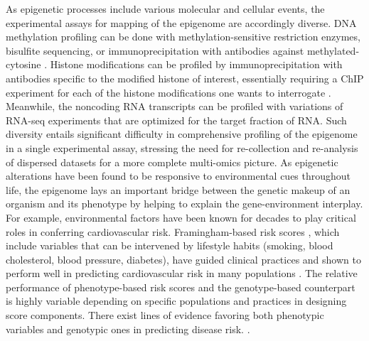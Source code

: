 \documentclass[letter]{bioinfo}
\begin{document}
	As epigenetic processes include various molecular and cellular events, the experimental assays for mapping of the epigenome are accordingly diverse. DNA methylation profiling can be done with methylation-sensitive restriction enzymes, bisulfite sequencing, or immunoprecipitation with antibodies against methylated-cytosine \citep{Bibikova:2010:Genomewide}. Histone modifications can be profiled by immunoprecipitation with antibodies specific to the modified histone of interest, essentially requiring a ChIP experiment for each of the histone modifications one wants to interrogate \citep{Kimura:2013:Histone}. Meanwhile, the noncoding RNA transcripts can be profiled with variations of RNA-seq experiments that are optimized for the target fraction of RNA. Such diversity entails significant difficulty in comprehensive profiling of the epigenome in a single experimental assay, stressing the need for re-collection and re-analysis of dispersed datasets for a more complete multi-omics picture. As epigenetic alterations have been found to be responsive to environmental cues throughout life, the epigenome lays an important bridge between the genetic makeup of an organism and its phenotype by helping to explain the gene-environment interplay.
	For example, environmental factors have been known for decades to play critical roles in conferring cardiovascular risk. Framingham-based risk scores \citep{Sheridan:2003:Framinghambased}, which include variables that can be intervened by lifestyle habits (smoking, blood cholesterol, blood pressure, diabetes), have guided clinical practices \citep{British:1998:Joint} and shown to perform well in predicting cardiovascular risk in many populations \citep{Knuiman:1997:Prediction,Eichler:2007:Prediction}. The relative performance of phenotype-based risk scores and the genotype-based counterpart is highly variable depending on specific populations and practices in designing score components. There exist lines of evidence favoring both phenotypic variables \citep{Talmud:2010:Utility} and genotypic ones in predicting disease risk.
	\citep{DAgostino:2001:Validation,Empana:2003:Are,Eichler:2007:Prediction,Zomer:2014:Cardiovascular}.
\end{document}
